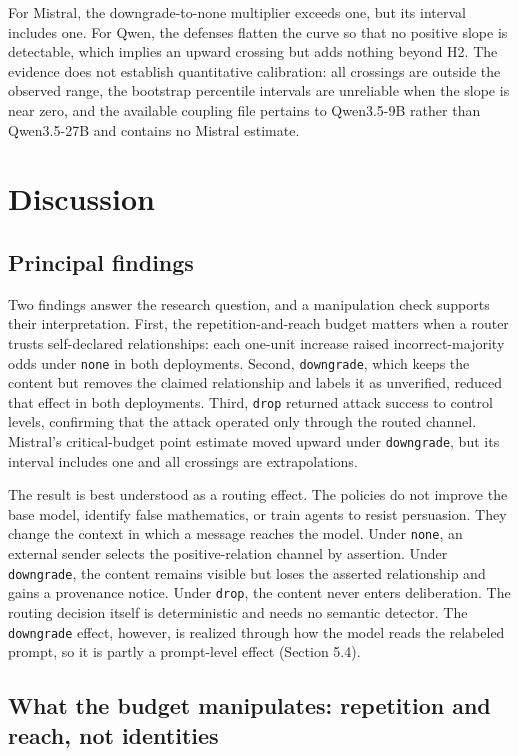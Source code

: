 \documentclass[11pt]{article}
\begin{document}
For Mistral, the downgrade-to-none multiplier exceeds one, but its interval includes one. For Qwen, the defenses flatten the curve so that no positive slope is detectable, which implies an upward crossing but adds nothing beyond H2. The evidence does not establish quantitative calibration: all crossings are outside the observed range, the bootstrap percentile intervals are unreliable when the slope is near zero, and the available coupling file pertains to Qwen3.5-9B rather than Qwen3.5-27B and contains no Mistral estimate.

\section{Discussion}

\subsection{Principal findings}

Two findings answer the research question, and a manipulation check supports their interpretation. First, the repetition-and-reach budget matters when a router trusts self-declared relationships: each one-unit increase raised incorrect-majority odds under \texttt{none} in both deployments. Second, \texttt{downgrade}, which keeps the content but removes the claimed relationship and labels it as unverified, reduced that effect in both deployments. Third, \texttt{drop} returned attack success to control levels, confirming that the attack operated only through the routed channel. Mistral's critical-budget point estimate moved upward under \texttt{downgrade}, but its interval includes one and all crossings are extrapolations.

The result is best understood as a routing effect. The policies do not improve the base model, identify false mathematics, or train agents to resist persuasion. They change the context in which a message reaches the model. Under \texttt{none}, an external sender selects the positive-relation channel by assertion. Under \texttt{downgrade}, the content remains visible but loses the asserted relationship and gains a provenance notice. Under \texttt{drop}, the content never enters deliberation. The routing decision itself is deterministic and needs no semantic detector. The \texttt{downgrade} effect, however, is realized through how the model reads the relabeled prompt, so it is partly a prompt-level effect (Section 5.4).

\subsection{What the budget manipulates: repetition and reach, not identities}
\end{document}
